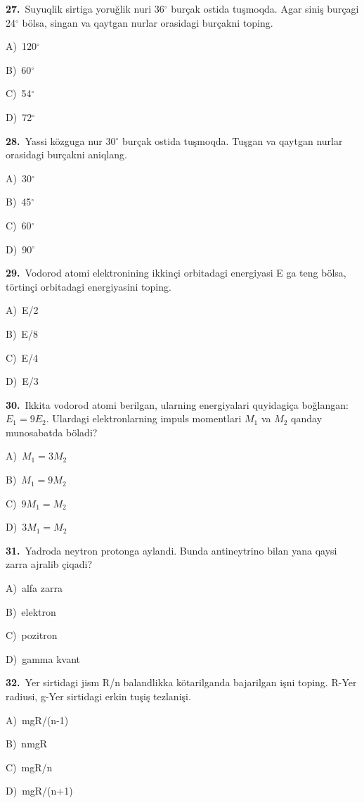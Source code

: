 \documentclass[11pt,a4paper]{article}
\newcommand{\opt}[2]{\hspace*{4mm}#1)\ #2\par}
\begin{document}
\noindent\begin{minipage}{\linewidth}
\textbf{27.}\ Suyuqlik sirtiga yoruğlik nuri 36$^\circ$ burçak ostida tuşmoqda. Agar siniş burçagi 24$^\circ$ bölsa, singan va qaytgan nurlar orasidagi burçakni toping.\par\smallskip
\opt{A}{120$^\circ$}
\opt{B}{60$^\circ$}
\opt{C}{54$^\circ$}
\opt{D}{72$^\circ$}
\end{minipage}\vspace{9pt}\par
\noindent\begin{minipage}{\linewidth}
\textbf{28.}\ Yassi közguga nur 30$^\circ$ burçak ostida tuşmoqda. Tuşgan va qaytgan nurlar orasidagi burçakni aniqlang.\par\smallskip
\opt{A}{30$^\circ$}
\opt{B}{45$^\circ$}
\opt{C}{60$^\circ$}
\opt{D}{90$^\circ$}
\end{minipage}\vspace{9pt}\par
\noindent\begin{minipage}{\linewidth}
\textbf{29.}\ Vodorod atomi elektronining ikkinçi orbitadagi energiyasi E ga teng bölsa, törtinçi orbitadagi energiyasini toping.\par\smallskip
\opt{A}{E/2}
\opt{B}{E/8}
\opt{C}{E/4}
\opt{D}{E/3}
\end{minipage}\vspace{9pt}\par
\noindent\begin{minipage}{\linewidth}
\textbf{30.}\ Ikkita vodorod atomi berilgan, ularning energiyalari quyidagiça boğlangan: $E_1 = 9E_2$. Ulardagi elektronlarning impuls momentlari $M_1$ va $M_2$ qanday munosabatda böladi?\par\smallskip
\opt{A}{$M_1 = 3M_2$}
\opt{B}{$M_1 = 9M_2$}
\opt{C}{$9M_1 = M_2$}
\opt{D}{$3M_1 = M_2$}
\end{minipage}\vspace{9pt}\par
\noindent\begin{minipage}{\linewidth}
\textbf{31.}\ Yadroda neytron protonga aylandi. Bunda antineytrino bilan yana qaysi zarra ajralib çiqadi?\par\smallskip
\opt{A}{alfa zarra}
\opt{B}{elektron}
\opt{C}{pozitron}
\opt{D}{gamma kvant}
\end{minipage}\vspace{9pt}\par
\noindent\begin{minipage}{\linewidth}
\textbf{32.}\ Yer sirtidagi jism R/n balandlikka kötarilganda bajarilgan işni toping. R-Yer radiusi, g-Yer sirtidagi erkin tuşiş tezlanişi.\par\smallskip
\opt{A}{mgR/(n-1)}
\opt{B}{nmgR}
\opt{C}{mgR/n}
\opt{D}{mgR/(n+1)}
\end{minipage}\vspace{9pt}\par
\end{document}
